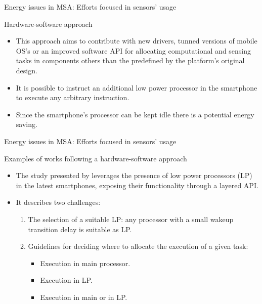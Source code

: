 \begin{frame}{Energy issues in MSA: Efforts focused in sensors' usage}
  \begin{block}{Hardware-software approach}
    \begin{itemize}
      \item This approach aims to contribute with new drivers, tunned versions of mobile OS's or an improved software API for allocating computational and sensing tasks in components others than the predefined by the platform's original design.
      \item It is possible to instruct an additional low power processor in the smartphone to execute any arbitrary instruction.
      \item Since the smartphone's processor can be kept idle there is a potential energy saving.
    \end{itemize}
  \end{block}
\end{frame}

\begin{frame}{Energy issues in MSA: Efforts focused in sensors' usage}
  \begin{block}{Examples of works following a hardware-software approach}
  \begin{itemize}
    \item The study presented by \citep{Ra2012} leverages the presence of low power processors (LP) in the latest smartphones, exposing their functionality through a layered API.

    \item It describes two challenges:
    \begin{enumerate}
       \item The selection of a suitable LP: any processor with a small wakeup transition delay is suitable as LP.
       \item Guidelines for deciding where to allocate the execution of a given task:
       \begin{itemize}
          \item Execution in main processor.
          \item Execution in LP.
          \item Execution in main or in LP.
      \end{itemize}
    \end{enumerate}
  \end{itemize}
  \end{block}
\end{frame}

